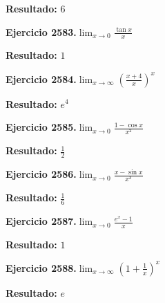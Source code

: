 \documentclass[10pt,a4paper]{article}
\begin{document}
\begin{solbox}
\textbf{Resultado:} \(\displaystyle 6\)
\end{solbox}

\newpage
\begin{ejbox}
\textbf{Ejercicio 2583.}\quad $\lim_{x\to 0} \frac{\tan x}{x}$
\end{ejbox}

\begin{solbox}
\textbf{Resultado:} \(\displaystyle 1\)
\end{solbox}

\begin{ejbox}
\textbf{Ejercicio 2584.}\quad $\lim_{x\to \infty} \left(\frac{x+4}{x}\right)^{x}$
\end{ejbox}

\begin{solbox}
\textbf{Resultado:} \(\displaystyle e^{4}\)
\end{solbox}

\begin{ejbox}
\textbf{Ejercicio 2585.}\quad $\lim_{x\to 0} \frac{1-\cos x}{x^2}$
\end{ejbox}

\begin{solbox}
\textbf{Resultado:} \(\displaystyle \frac{1}{2}\)
\end{solbox}

\newpage
\begin{ejbox}
\textbf{Ejercicio 2586.}\quad $\lim_{x\to 0} \frac{x-\sin x}{x^3}$
\end{ejbox}

\begin{solbox}
\textbf{Resultado:} \(\displaystyle \frac{1}{6}\)
\end{solbox}

\begin{ejbox}
\textbf{Ejercicio 2587.}\quad $\lim_{x\to 0} \frac{e^x-1}{x}$
\end{ejbox}

\begin{solbox}
\textbf{Resultado:} \(\displaystyle 1\)
\end{solbox}

\begin{ejbox}
\textbf{Ejercicio 2588.}\quad $\lim_{x\to \infty} \left(1+\frac{1}{x}\right)^x$
\end{ejbox}

\begin{solbox}
\textbf{Resultado:} \(\displaystyle e\)
\end{solbox}
\end{document}
